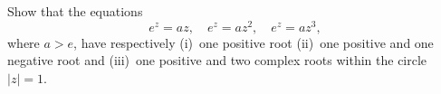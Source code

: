 Show that the equations
\[
e^{z} = az,\quad
e^{z} = az^{2},\quad
e^{z} = az^{3},
\]
where $a > e$, have respectively (i)~one positive root (ii)~one positive and one
negative root and (iii)~one positive and two complex roots within the circle
$|z| = 1$.  

